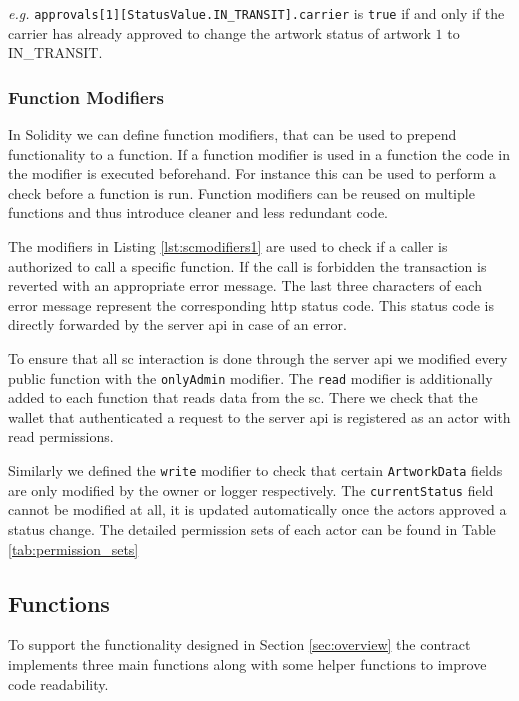 

\textit{e.g.} \texttt{approvals[1][StatusValue.IN\_TRANSIT].carrier} is \texttt{true} if and only if the carrier has already approved to change the artwork status of artwork $1$ to IN\_TRANSIT.


\subsubsection{Function Modifiers}
In Solidity we can define function modifiers, that can be used to prepend functionality to a function. If a function modifier is used in a function the code in the modifier is executed beforehand. For instance this can be used to perform a check before a function is run. Function modifiers can be reused on multiple functions and thus introduce cleaner and less redundant code.



The modifiers in Listing \ref{lst:scmodifiers1} are used to check if a caller is authorized to call a specific function. If the call is forbidden the transaction is reverted with an appropriate error message. The last three characters of each error message represent the corresponding \gls{http} status code. This status code is directly forwarded by the server \gls{api} in case of an error.

To ensure that all \gls{sc} interaction is done through the server \gls{api} we modified every public function with the \texttt{onlyAdmin} modifier. The \texttt{read} modifier is additionally added to each function that reads data from the \gls{sc}. There we check that the wallet that authenticated a request to the server \gls{api} is registered as an actor with read permissions.

Similarly we defined the \texttt{write} modifier to check that certain \texttt{ArtworkData} fields are only modified by the owner or logger respectively. The \texttt{currentStatus} field cannot be modified at all, it is updated automatically once the actors approved a status change. The detailed permission sets of each actor can be found in Table \ref{tab:permission_sets} 

\subsection{Functions}
To support the functionality designed in Section \ref{sec:overview} the contract implements three main functions along with some helper functions to improve code readability.

